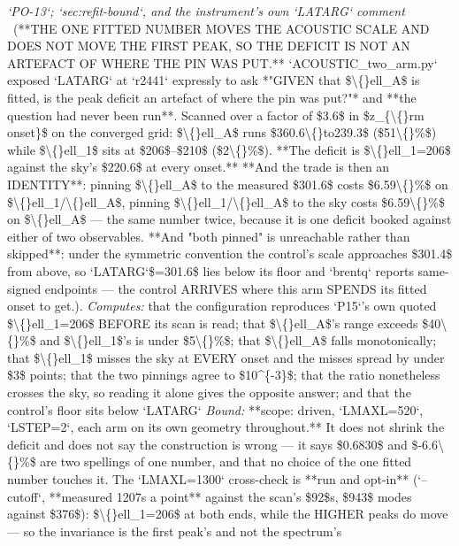 \begin{description}
\textit{`PO-13`; `sec:refit-bound`, and the instrument's own `LATARG` comment} \ (**THE ONE FITTED NUMBER MOVES THE ACOUSTIC SCALE AND DOES NOT MOVE THE FIRST PEAK, SO THE DEFICIT IS NOT AN ARTEFACT OF WHERE THE PIN WAS PUT.** `ACOUSTIC\_two\_arm.py` exposed `LATARG` at `r2441` expressly to ask *"GIVEN that \$\textbackslash\{\}ell\_A\$ is fitted, is the peak deficit an artefact of where the pin was put?"* and **the question had never been run**. Scanned over a factor of \$3.6\$ in \$z\_\{\textbackslash\{\}rm onset\}\$ on the converged grid: \$\textbackslash\{\}ell\_A\$ runs \$360.6\textbackslash\{\}to239.3\$ (\$51\textbackslash\{\}\%\$) while \$\textbackslash\{\}ell\_1\$ sits at \$206\$--\$210\$ (\$2\textbackslash\{\}\%\$). **The deficit is \$\textbackslash\{\}ell\_1=206\$ against the sky's \$220.6\$ at every onset.**  **And the trade is then an IDENTITY**: pinning \$\textbackslash\{\}ell\_A\$ to the measured \$301.6\$ costs \$6.59\textbackslash\{\}\%\$ on \$\textbackslash\{\}ell\_1/\textbackslash\{\}ell\_A\$, pinning \$\textbackslash\{\}ell\_1/\textbackslash\{\}ell\_A\$ to the sky costs \$6.59\textbackslash\{\}\%\$ on \$\textbackslash\{\}ell\_A\$ --- the same number twice, because it is one deficit booked against either of two observables.  **And "both pinned" is unreachable rather than skipped**: under the symmetric convention the control's scale approaches \$301.4\$ from above, so `LATARG`\$=301.6\$ lies below its floor and `brentq` reports same-signed endpoints --- the control ARRIVES where this arm SPENDS its fitted onset to get.). 
\emph{Computes:} that the configuration reproduces `P15`'s own quoted \$\textbackslash\{\}ell\_1=206\$ BEFORE its scan is read; that \$\textbackslash\{\}ell\_A\$'s range exceeds \$40\textbackslash\{\}\%\$ and \$\textbackslash\{\}ell\_1\$'s is under \$5\textbackslash\{\}\%\$; that \$\textbackslash\{\}ell\_A\$ falls monotonically; that \$\textbackslash\{\}ell\_1\$ misses the sky at EVERY onset and the misses spread by under \$3\$ points; that the two pinnings agree to \$10\textasciicircum{}\{-3\}\$; that the ratio nonetheless crosses the sky, so reading it alone gives the opposite answer; and that the control's floor sits below `LATARG`
 \emph{Bound:} **scope: driven, `LMAXL=520`, `LSTEP=2`, each arm on its own geometry throughout.** It does not shrink the deficit and does not say the construction is wrong --- it says \$0.6830\$ and \$-6.6\textbackslash\{\}\%\$ are two spellings of one number, and that no choice of the one fitted number touches it. The `LMAXL=1300` cross-check is **run and opt-in** (`--cutoff`, **measured 1207s a point** against the scan's \$92\$s, \$943\$ modes against \$376\$): \$\textbackslash\{\}ell\_1=206\$ at both ends, while the HIGHER peaks do move --- so the invariance is the first peak's and not the spectrum's

\end{description}
